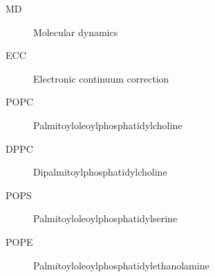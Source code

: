 \documentclass[12pt,a4paper]{report}
\begin{document}



\tableofcontents









\listoffigures

\listoftables


\begin{description}   %
\item [MD] Molecular dynamics
\item [ECC] Electronic continuum correction
\item [POPC] Palmitoyloleoylphosphatidylcholine
\item [DPPC] Dipalmitoylphosphatidylcholine
\item [POPS] Palmitoyloleoylphosphatidylserine
\item [POPE] Palmitoyloleoylphosphatidylethanolamine
\end{description}


\appendix
\end{document}
